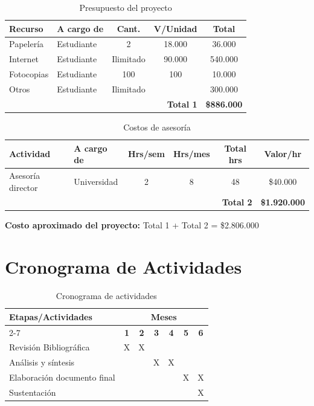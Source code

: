 \documentclass[12pt,letterpaper,oneside]{book}
\theoremstyle{definition}
\theoremstyle{remark}
\begin{document}
	\vspace{0.5cm}
	
	\begin{table}[H]
		\centering
		\begin{tabular}{|p{4cm}|p{3cm}|c|c|c|}
			\hline
			\textbf{Recurso} & \textbf{A cargo de} & \textbf{Cant.} & \textbf{V/Unidad} & \textbf{Total} \\ \hline
			Papelería & Estudiante & 2 & 18.000 & 36.000 \\ \hline
			Internet & Estudiante & Ilimitado & 90.000 & 540.000 \\ \hline
			Fotocopias & Estudiante & 100 & 100 & 10.000 \\ \hline
			Otros & Estudiante & Ilimitado &  & 300.000 \\ \hline
			\multicolumn{4}{|r|}{\textbf{Total 1}} & \textbf{\$886.000} \\ \hline
		\end{tabular}
		\caption{Presupuesto del proyecto}
	\end{table}
	
	\vspace{1cm}
	
	\begin{table}[H]
		\centering
		\begin{tabular}{|p{3cm}|p{2.5cm}|c|c|c|c|}
			\hline
			\textbf{Actividad} & \textbf{A cargo de} & \textbf{Hrs/sem} & \textbf{Hrs/mes} & \textbf{Total hrs} & \textbf{Valor/hr} \\ \hline
			Asesoría director & Universidad & 2 & 8 & 48 & \$40.000 \\ \hline
			\multicolumn{5}{|r|}{\textbf{Total 2}} & \textbf{\$1.920.000} \\ \hline
		\end{tabular}
		\caption{Costos de asesoría}
	\end{table}
	
	\vspace{0.5cm}
	\noindent\textbf{Costo aproximado del proyecto:} Total 1 + Total 2 = \$2.806.000
	
	\chapter{Cronograma de Actividades}
	
	\begin{table}[H]
		\centering
		\begin{tabular}{|p{6cm}|c|c|c|c|c|c|}
			\hline
			\textbf{Etapas/Actividades} & \multicolumn{6}{c|}{\textbf{Meses}} \\ \cline{2-7}
			& \textbf{1} & \textbf{2} & \textbf{3} & \textbf{4} & \textbf{5} & \textbf{6} \\ \hline
			Revisión Bibliográfica & X & X & & & & \\ \hline
			Análisis y síntesis & & & X & X & & \\ \hline
			Elaboración documento final & & & & & X & X \\ \hline
			Sustentación & & & & & & X \\ \hline
		\end{tabular}
		\caption{Cronograma de actividades}
	\end{table}
	
\end{document}
